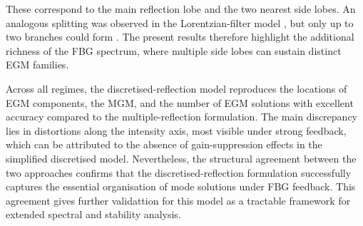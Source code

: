 These correspond to the main reflection lobe and the two nearest side lobes. 
An analogous splitting was observed in the Lorentzian-filter model \cite{yousefi1999dynamical}, but only up to two branches could form \cite{green2006mode}. 
The present results therefore highlight the additional richness of the FBG spectrum, where multiple side lobes can sustain distinct EGM families. 
%
\par
%
Across all regimes, the discretised-reflection model reproduces the locations of EGM components, the MGM, and the number of EGM solutions with excellent accuracy compared to the multiple-reflection formulation. 
The main discrepancy lies in distortions along the intensity axis, most visible under strong feedback, which can be attributed to the absence of gain-suppression effects in the simplified discretised model. 
Nevertheless, the structural agreement between the two approaches confirms that the discretised-reflection formulation successfully captures the essential organisation of mode solutions under FBG feedback. 
This agreement gives further validattion for this model as a tractable framework for extended spectral and stability analysis.
%
